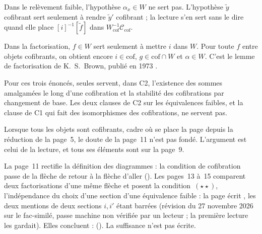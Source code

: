\begin{remarque}
Dans le relèvement faible, l'hypothèse $\alpha_x \in W$ ne sert pas. L'hypothèse $\widetilde y$ cofibrant sert seulement à rendre $\widetilde y'$ cofibrant ; la lecture s'en sert sans le dire quand elle place $[i]^{-1}[\widetilde f]$ dans $W_{\mathrm{cof}}^{-1}\mathcal C_{\mathrm{cof}}$.
\end{remarque}

\begin{remarque}
Dans la factorisation, $f \in W$ sert seulement à mettre $i$ dans $W$. Pour toute $f$ entre objets cofibrants, on obtient encore $i \in \mathrm{cof}$, $g \in \mathrm{cof} \cap W$ et $\alpha \in W$. C'est le lemme de factorisation de K.~S.~Brown, publié en 1973 \cite{brown1973}.
\end{remarque}

\begin{remarque}
Pour ces trois énoncés, seules servent, dans C2, l'existence des sommes amalgamées le long d'une cofibration et la stabilité des cofibrations par changement de base. Les deux clauses de C2 sur les équivalences faibles, et la clause de C1 qui fait des isomorphismes des cofibrations, ne servent pas.
\end{remarque}

\begin{remarque}
Lorsque tous les objets sont cofibrants, cadre où se place la page depuis la réduction de la page~5, le doute de la page~11 n'est pas fondé. L'argument est celui de la lecture, et tous ses éléments sont sur la page~9.
\end{remarque}

La page~11 rectifie la définition des diagrammes : la condition de cofibration passe de la flèche de retour à la flèche d'aller (). Les pages~13 à~15 comparent deux factorisations d'une même flèche et posent la condition~$(\star\star)$, l'indépendance du choix d'une section d'une équivalence faible : la page écrit , les deux mentions de deux sections $i, i'$ étant barrées (révision du 27 novembre 2026 sur le fac-similé, passe machine non vérifiée par un lecteur ; la première lecture les gardait). Elles concluent :  (). La suffisance n'est pas écrite.

